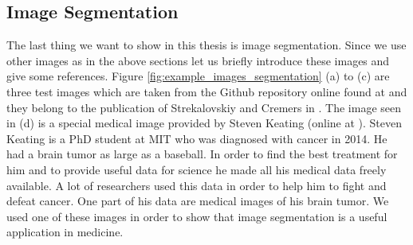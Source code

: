 \documentclass[abstracton]{scrreprt}
\begin{document}
        \subsection{Image Segmentation} %
        \label{sub:image_segmentation}

            The last thing we want to show in this thesis is image segmentation. Since we use other images as in the above sections let us briefly introduce these images and give some references. Figure \ref{fig:example_images_segmentation} (a) to (c) are three test images which are taken from the Github repository online found at \cite{FastMS} and they belong to the publication of Strekalovskiy and Cremers in \cite{Strekalovskiy-Cremers-eccv14}. The image seen in (d) is a special medical image provided by Steven Keating (online at \cite{Keating}). Steven Keating is a PhD student at MIT who was diagnosed with cancer in 2014. He had a brain tumor as large as a baseball. In order to find the best treatment for him and to provide useful data for science he made all his medical data freely available. A lot of researchers used this data in order to help him to fight and defeat cancer. One part of his data are medical images of his brain tumor. We used one of these images in order to show that image segmentation is a useful application in medicine.
\end{document}
